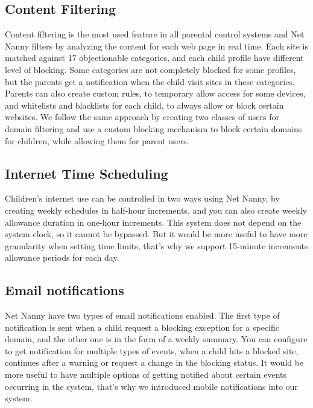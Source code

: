\subsection{Content Filtering}

Content filtering is the most used feature in all parental control systems and Net Nanny filters by analyzing the content for each web page in real time. Each site is matched against 17 objectionable categories, and each child profile have different level of blocking. Some categories are not completely blocked for some profiles, but the parents get a notification when the child visit sites in these categories. Parents can also create custom rules, to temporary allow access for some devices, and whitelists and blacklists for each child, to always allow or block certain websites. We follow the same approach by creating two classes of users for domain filtering and use a custom blocking mechanism to block certain domains for children, while allowing them for parent users.

\subsection{Internet Time Scheduling}

Children's internet use can be controlled in two ways using Net Nanny, by creating weekly schedules in half-hour increments, and you can also create weekly allowance duration in one-hour increments. This system does not depend on the system clock, so it cannot be bypassed. But it would be more useful to have more granularity when setting time limits, that's why we support 15-minute increments allowance periods for each day.

\subsection{Email notifications}

Net Nanny have two types of email notifications enabled. The first type of notification is sent when a child request a blocking exception for a specific domain, and the other one is in the form of a weekly summary. You can configure to get notification for multiple types of events, when a child hits a blocked site, continues after a warning or request a change in the blocking status. It would be more useful to have multiple options of getting notified about certain events occurring in the system, that's why we introduced mobile notifications into our system.

